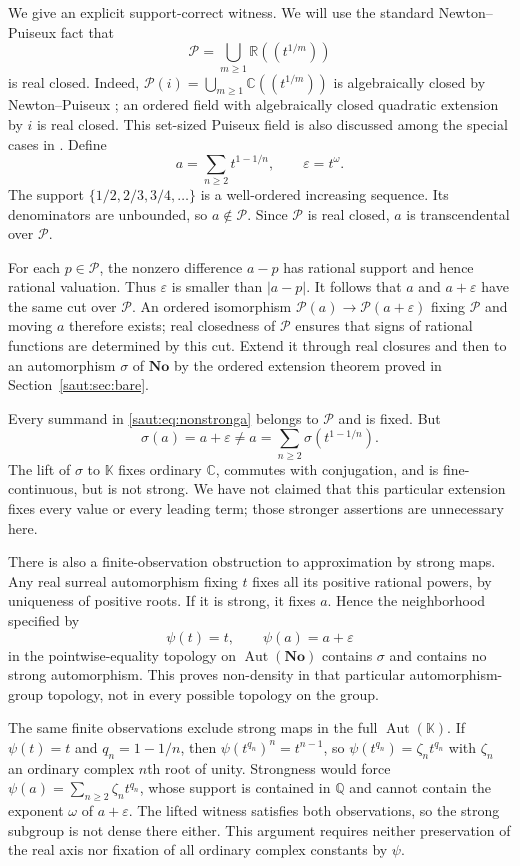 \documentclass[11pt]{article}
\theoremstyle{definition}
\theoremstyle{remark}
\newcommand{\No}{\mathbf{No}}
\newcommand{\R}{\mathbb R}
\newcommand{\C}{\mathbb C}
\newcommand{\Q}{\mathbb Q}
\newcommand{\K}{\mathbb K}
\newcommand{\Aut}{\operatorname{Aut}}
\numberwithin{equation}{section}
\begin{document}
We give an explicit support-correct witness. We will use the standard
Newton--Puiseux fact that
\[
 \mathcal P=\bigcup_{m\ge1}\R((t^{1/m}))
\]
is real closed. Indeed,
$\mathcal P(i)=\bigcup_{m\ge1}\C((t^{1/m}))$ is algebraically closed by
Newton--Puiseux \cite{ParanVo}; an ordered field with algebraically closed
quadratic extension by $i$ is real closed. This set-sized Puiseux field is
also discussed among the special cases in \cite[Section~5.5]{KS}. Define
\begin{equation}\label{saut:eq:nonstronga}
 a=\sum_{n\ge2}t^{1-1/n},\qquad \varepsilon=t^\omega.
\end{equation}
The support $\{1/2,2/3,3/4,\ldots\}$ is a well-ordered increasing sequence.
Its denominators are unbounded, so $a\notin \mathcal P$. Since $\mathcal P$ is real closed,
$a$ is transcendental over $\mathcal P$.

For each $p\in \mathcal P$, the nonzero difference $a-p$ has rational support and
hence rational valuation. Thus $\varepsilon$ is smaller than $|a-p|$.
It follows that $a$ and $a+\varepsilon$ have the same cut over $\mathcal P$.
An ordered isomorphism $\mathcal P(a)\to \mathcal P(a+\varepsilon)$ fixing $\mathcal P$ and moving $a$
therefore exists; real closedness of $\mathcal P$ ensures that signs of rational
functions are determined by this cut. Extend it through real closures and
then to an automorphism $\sigma$ of $\No$ by the ordered extension theorem
proved in Section~\ref{saut:sec:bare}.

Every summand in \eqref{saut:eq:nonstronga} belongs to $\mathcal P$ and is fixed. But
\[
 \sigma(a)=a+\varepsilon\ne a
     =\sum_{n\ge2}\sigma(t^{1-1/n}).
\]
The lift of $\sigma$ to $\K$ fixes ordinary $\C$, commutes with conjugation,
and is fine-continuous, but is not strong.
We have not claimed that this particular extension fixes every value or
every leading term; those stronger assertions are unnecessary here.

There is also a finite-observation obstruction to approximation by strong
maps. Any real surreal automorphism fixing $t$ fixes all its positive
rational powers, by uniqueness of positive roots. If it is strong, it fixes
$a$. Hence the neighborhood specified by
\[
 \psi(t)=t,\qquad \psi(a)=a+\varepsilon
\]
in the pointwise-equality topology on $\Aut(\No)$ contains $\sigma$ and
contains no strong automorphism. This proves non-density in that particular
automorphism-group topology, not in every possible topology on the group.

The same finite observations exclude strong maps in the full $\Aut(\K)$.
If $\psi(t)=t$ and $q_n=1-1/n$, then
$\psi(t^{q_n})^n=t^{n-1}$, so
$\psi(t^{q_n})=\zeta_n t^{q_n}$ with $\zeta_n$ an ordinary complex
$n$th root of unity. Strongness would force
$\psi(a)=\sum_{n\ge2}\zeta_n t^{q_n}$, whose support is contained in
$\Q$ and cannot contain the exponent $\omega$ of $a+\varepsilon$.
The lifted witness satisfies both observations, so the strong subgroup
is not dense there either. This argument requires neither preservation of
the real axis nor fixation of all ordinary complex constants by $\psi$.
\end{document}
